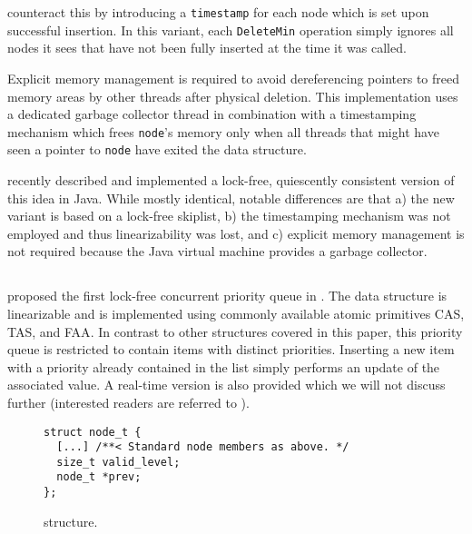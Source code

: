 \documentclass[a4paper,10pt]{article}
\begin{document}
\citeauthor{shavit2000skiplist} counteract this by introducing a \lstinline|timestamp| for each
node which is set upon successful insertion. In this variant, each \lstinline|DeleteMin| operation
simply ignores all nodes it sees that have not been fully inserted at the time it was called.

Explicit memory management is required to avoid dereferencing pointers to freed memory areas
by other threads after physical deletion. This implementation uses a dedicated garbage collector
thread in combination with a timestamping mechanism which frees \lstinline|node|'s memory only
when all threads that might have seen a pointer to \lstinline|node| have exited the data structure.

\citeauthor{herlihy2012art} \cite{herlihy2012art} recently described and implemented a lock-free,
quiescently consistent version of this idea in Java. While mostly identical, notable differences are
that a) the new variant is based on a lock-free skiplist, b) the timestamping mechanism was not
employed and thus linearizability was lost, and c) explicit memory management is not required
because the Java virtual machine provides a garbage collector.

\subsection{\citeauthor{sundell2003fast}} \label{sec:sundell}

\citeauthor{sundell2003fast} proposed the first lock-free concurrent priority queue in
\citeyear{sundell2003fast} \cite{sundell2003fast}. The data structure is linearizable
and is implemented using commonly available atomic primitives \ac{CAS}, \ac{TAS}, and \ac{FAA}.
In contrast to other structures covered in this paper, this priority queue is restricted to
contain items with distinct priorities. Inserting a new item with a priority already contained
in the list simply performs an update of the associated value.
A real-time version is also provided which we will not discuss further (interested readers are
referred to \cite{sundell2003fast}).

\begin{figure}[ht]
\begin{lstlisting}
struct node_t {
  [...] /**< Standard node members as above. */
  size_t valid_level;
  node_t *prev;
};
\end{lstlisting}
\caption{\citeauthor{sundell2003fast} structure.}
\label{fig:sundellsl}
\end{figure}
\end{document}
